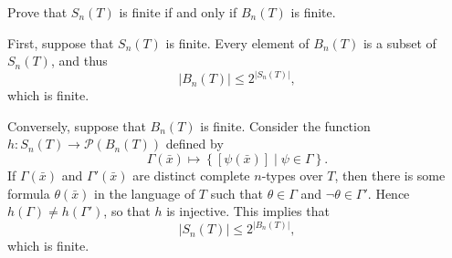 \documentclass[10pt,letterpaper,cm]{nupset}
\theoremstyle{definition}
\theoremstyle{theorem}
\theoremstyle{remark}
\renewcommand{\P}{\mathcal P}
\newcommand{\1}{\mathbb{1}}
\newcommand{\0}{\vec 0}
\begin{document}
\begin{problem}[9.]
Prove that $S_n(T)$ is finite if and only if $B_n(T)$ is finite.
\end{problem}
\begin{solution}
First, suppose that $S_n(T)$  is finite. Every element of $B_n(T)$ is a subset of $S_n(T)$, and thus
$$
\left\lvert{B_n(T)}\right\rvert \leq 2^{\left\lvert{S_n(T)}\right\rvert},$$ which is finite.

\smallskip

Conversely, suppose that $B_n(T)$ is finite. Consider the function $h: S_n(T) \to \P(B_n(T))$ defined by $$\Gamma(\bar{x}) \mapsto \left\{\left[\psi(\bar{x})\right] \mid \psi \in \Gamma\right\}.$$ If $\Gamma(\bar{x})$ and  $\Gamma'(\bar{x})$ are distinct complete $n$-types over $T$, then there is some formula $\theta(\bar{x})$ in the language of $T$ such that $\theta \in \Gamma$ and $\neg{\theta} \in \Gamma'$. Hence $h(\Gamma) \ne h(\Gamma')$, so that $h$ is injective. This implies that $$\left\lvert{S_n(T)}\right\rvert\leq 2^{\left\lvert{B_n(T)}\right\rvert},$$ which is finite.
\end{solution}
\end{document}
